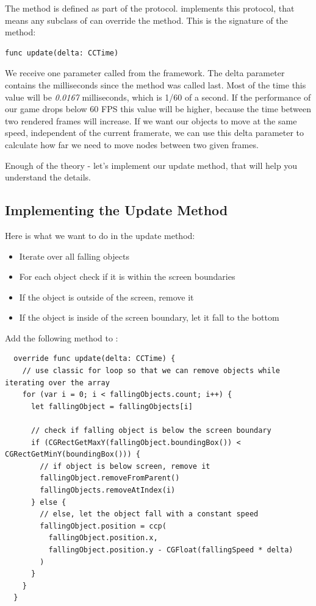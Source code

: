 The  method is defined as part of the
protocol.  implements this protocol, that means any subclass
of  can override the method. This is the signature of the
 method:
\begin{lstlisting}
func update(delta: CCTime)
\end{lstlisting}
We receive one parameter called  from the \cocos{} framework.
The delta parameter contains the milliseconds since the 
method was called last. Most of the time this value will be \textit{0.0167}
milliseconds, which is 1/60 of a second. If the performance of our game drops
below 60 FPS this value will be higher, because the time between two rendered
frames will increase. If we want our objects to move at the same speed,
independent of the current framerate, we can use this delta parameter to
calculate how far we need to move nodes between two given frames.

Enough of the theory - let's implement our update method, that will help you
understand the details.

\subsection{Implementing the Update Method}
Here is what we want to do in the update method:

\begin{itemize}
  \item Iterate over all falling objects
  \item For each object check if it is within the screen boundaries
  \item If the object is outside of the screen, remove it
  \item If the object is inside of the screen boundary, let it fall to the
  bottom
\end{itemize}

\begin{leftbar}
Add the following  method to :
\begin{lstlisting}
  override func update(delta: CCTime) {
    // use classic for loop so that we can remove objects while iterating over the array
    for (var i = 0; i < fallingObjects.count; i++) {
      let fallingObject = fallingObjects[i]
      
      // check if falling object is below the screen boundary
      if (CGRectGetMaxY(fallingObject.boundingBox()) < CGRectGetMinY(boundingBox())) {
        // if object is below screen, remove it
        fallingObject.removeFromParent()
        fallingObjects.removeAtIndex(i)
      } else {
        // else, let the object fall with a constant speed
        fallingObject.position = ccp(
          fallingObject.position.x,
          fallingObject.position.y - CGFloat(fallingSpeed * delta)
        )
      }
    }
  }
\end{lstlisting}
\end{leftbar}

